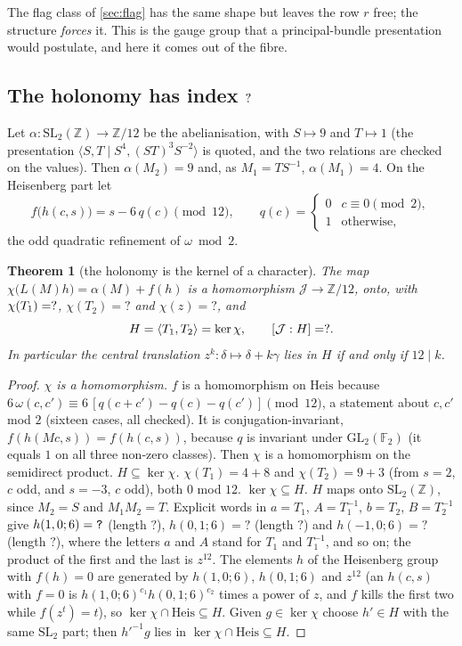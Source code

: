 \documentclass[11pt,a4paper]{article}
\newcommand{\SSGaChiTwo}{?}\newcommand{\SSGaChiZ}{?}\newcommand{\SSGaChiLeviOne}{?}
\newcommand{\SSGaWordHTwo}{?}\newcommand{\SSGaWordHMinus}{?}\newcommand{\SSGaWordLenOne}{?}
\newcommand{\SSGaWordLenTwo}{?}\newcommand{\SSGaWordLenMinus}{?}\newcommand{\SSGaTensorDims}{?}
\newcommand{\ZZ}{\mathbb{Z}}
\newcommand{\SL}{\mathrm{SL}}
\newcommand{\GL}{\mathrm{GL}}
\theoremstyle{plain}
\newtheorem{theorem}{Theorem}
\theoremstyle{definition}
\begin{document}
The flag class of \cref{sec:flag} has the same shape but leaves the row $r$ free; the
structure \emph{forces} it. This is the gauge group that a principal-bundle presentation
would postulate, and here it comes out of the fibre.

\subsection{The holonomy has index \texorpdfstring{$?$}{12}}

Let $\alpha\colon\SL_2(\ZZ)\to\ZZ/12$ be the abelianisation, with $S\mapsto 9$ and $T\mapsto 1$ (the presentation
$\langle S,T\mid S^4,(ST)^3S^{-2}\rangle$ is quoted, and the two relations are checked on
the values). Then $\alpha(M_2)=9$ and, as $M_1=TS^{-1}$, $\alpha(M_1)=4$. On the Heisenberg part let
\[
  f\bigl(h(c,s)\bigr)=s-6\,q(c)\pmod{12},\qquad q(c)=\begin{cases}0&c\equiv0\pmod2,\\1&\text{otherwise,}\end{cases}
\]
the odd quadratic refinement of $\omega \bmod 2$.

\begin{theorem}[the holonomy is the kernel of a character]
\label{thm:gauge-index}
The map $\chi\bigl(L(M)h\bigr)=\alpha(M)+f(h)$ is a homomorphism $\mathcal J\to\ZZ/12$,
onto, with $\chi(T_1)=?$, $\chi(T_2)=\SSGaChiTwo$ and $\chi(z)=\SSGaChiZ$, and
\[
  H=\langle T_1,T_2\rangle=\ker\chi ,\qquad[\mathcal J:H]=? .
\]
In particular the central translation $z^k\colon\delta\mapsto\delta+k\gamma$ lies in $H$ if
and only if $12\mid k$.
\end{theorem}

\begin{proof}
\emph{$\chi$ is a homomorphism.} $f$ is a homomorphism on $\mathrm{Heis}$ because
$6\,\omega(c,c')\equiv 6\,[q(c+c')-q(c)-q(c')]\pmod{12}$, a statement about $c,c'$ mod $2$
(sixteen cases, all checked). It is conjugation-invariant, $f(h(Mc,s))=f(h(c,s))$, because
$q$ is invariant under $\GL_2(\mathbb F_2)$ (it equals $1$ on all three non-zero classes).
Then $\chi$ is a homomorphism on the semidirect product.
\emph{$H\subseteq\ker\chi$.} $\chi(T_1)=4+8$ and $\chi(T_2)=9+3$ (from $s=2$, $c$ odd, and $s=-3$, $c$ odd), both $0$ mod $12$.
\emph{$\ker\chi\subseteq H$.} $H$ maps onto $\SL_2(\ZZ)$, since $M_2=S$ and $M_1M_2=T$. Explicit words
in $a=T_1$, $A=T_1^{-1}$, $b=T_2$, $B=T_2^{-1}$ give $h(1,0;6)=\texttt{?}$
(length $\SSGaWordLenOne$), $h(0,1;6)=\texttt{\SSGaWordHTwo}$ (length $\SSGaWordLenTwo$) and
$h(-1,0;6)=\texttt{\SSGaWordHMinus}$ (length $\SSGaWordLenMinus$), where the letters $a$ and $A$ stand for $T_1$ and $T_1^{-1}$, and so on; the product of the first and the last is $z^{12}$.
The elements $h$ of the Heisenberg group with $f(h)=0$ are generated by $h(1,0;6)$,
$h(0,1;6)$ and $z^{12}$ (an $h(c,s)$ with $f=0$ is $h(1,0;6)^{c_1}h(0,1;6)^{c_2}$ times a power of $z$, and $f$ kills the first two while $f(z^t)=t$), so $\ker\chi\cap\mathrm{Heis}\subseteq H$. Given $g\in\ker\chi$ choose $h'\in H$ with the same $\SL_2$ part; then $h'^{-1}g$ lies in $\ker\chi\cap\mathrm{Heis}\subseteq H$.
\end{proof}
\end{document}
